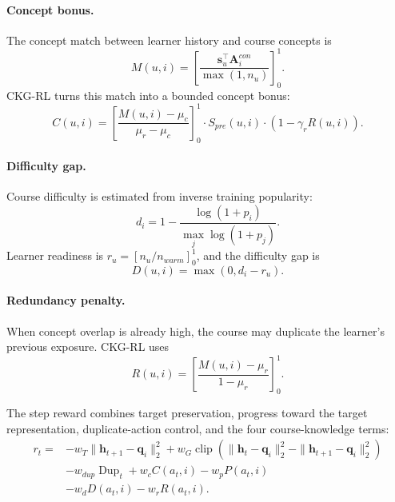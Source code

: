 \documentclass[sigconf,anonymous,review]{acmart}
\begin{document}
\paragraph{Concept bonus.}
The concept match between learner history and course concepts is
\begin{equation}
M(u,i)=
\left[
\frac{\mathbf{s}_u^\top \mathbf{A}^{con}_{i}}{\max(1,n_u)}
\right]_0^1.
\end{equation}
CKG-RL turns this match into a bounded concept bonus:
\begin{equation}
C(u,i)=
\left[
\frac{M(u,i)-\mu_c}{\mu_r-\mu_c}
\right]_0^1
\cdot S_{pre}(u,i)\cdot (1-\gamma_r R(u,i)).
\end{equation}

\paragraph{Difficulty gap.}
Course difficulty is estimated from inverse training popularity:
\begin{equation}
d_i=1-\frac{\log(1+p_i)}
{\max_j \log(1+p_j)}.
\end{equation}
Learner readiness is \(r_u=[n_u/n_{warm}]_0^1\), and the difficulty gap is
\begin{equation}
D(u,i)=\max(0,d_i-r_u).
\end{equation}

\paragraph{Redundancy penalty.}
When concept overlap is already high, the course may duplicate the learner's previous exposure. CKG-RL uses
\begin{equation}
R(u,i)=
\left[
\frac{M(u,i)-\mu_r}{1-\mu_r}
\right]_0^1.
\end{equation}

The step reward combines target preservation, progress toward the target representation, duplicate-action control, and the four course-knowledge terms:
\begin{align}
r_t=&-w_T\|\mathbf{h}_{t+1}-\mathbf{q}_i\|_2^2
+w_G\operatorname{clip}\left(
\|\mathbf{h}_t-\mathbf{q}_i\|_2^2
-\|\mathbf{h}_{t+1}-\mathbf{q}_i\|_2^2
\right) \nonumber\\
&-w_{dup}\operatorname{Dup}_t
+w_c C(a_t,i)-w_p P(a_t,i) \nonumber\\
&-w_d D(a_t,i)-w_r R(a_t,i).
\end{align}
\end{document}
